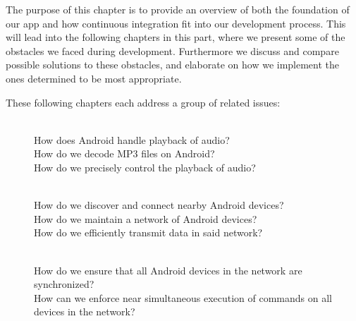 The purpose of this chapter is to provide an overview of both the foundation of our app and how continuous integration fit into our development process.
This will lead into the following chapters in this part, where we present some of the obstacles we faced during development.
Furthermore we discuss and compare possible solutions to these obstacles, and elaborate on how we implement the ones determined to be most appropriate.

These following chapters each address a group of related issues:
\begin{description}
    \item[] \hfill\\
        How does Android handle playback of audio?\\
        How do we decode MP3 files on Android?\\
        How do we precisely control the playback of audio?
    \item[] \hfill\\
        How do we discover and connect nearby Android devices?\\
        How do we maintain a network of Android devices?\\
        How do we efficiently transmit data in said network?
    \item[] \hfill\\
        How do we ensure that all Android devices in the network are synchronized?\\
        How can we enforce near simultaneous execution of commands on all devices in the network?
\end{description}
